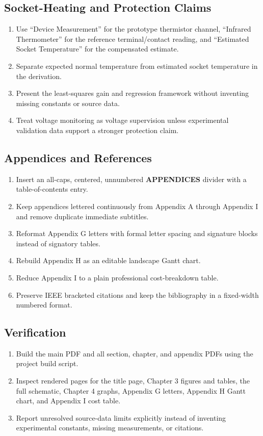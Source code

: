 \subsection*{Socket-Heating and Protection Claims}
\begin{enumerate}
  \item Use ``Device Measurement'' for the prototype thermistor channel,
  ``Infrared Thermometer'' for the reference terminal/contact reading, and
  ``Estimated Socket Temperature'' for the compensated estimate.
  \item Separate expected normal temperature from estimated socket temperature
  in the derivation.
  \item Present the least-squares gain and regression framework without
  inventing missing constants or source data.
  \item Treat voltage monitoring as voltage supervision unless experimental
  validation data support a stronger protection claim.
\end{enumerate}

\subsection*{Appendices and References}
\begin{enumerate}
  \item Insert an all-caps, centered, unnumbered \textbf{APPENDICES} divider
  with a table-of-contents entry.
  \item Keep appendices lettered continuously from Appendix A through
  Appendix I and remove duplicate immediate subtitles.
  \item Reformat Appendix G letters with formal letter spacing and signature
  blocks instead of signatory tables.
  \item Rebuild Appendix H as an editable landscape Gantt chart.
  \item Reduce Appendix I to a plain professional cost-breakdown table.
  \item Preserve IEEE bracketed citations and keep the bibliography in a
  fixed-width numbered format.
\end{enumerate}

\subsection*{Verification}
\begin{enumerate}
  \item Build the main PDF and all section, chapter, and appendix PDFs using
  the project build script.
  \item Inspect rendered pages for the title page, Chapter 3 figures and
  tables, the full schematic, Chapter 4 graphs, Appendix G letters, Appendix H
  Gantt chart, and Appendix I cost table.
  \item Report unresolved source-data limits explicitly instead of inventing
  experimental constants, missing measurements, or citations.
\end{enumerate}
